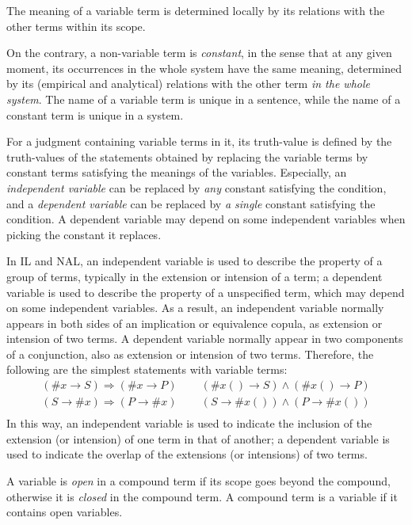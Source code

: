 \begin{defi}
The meaning of a variable term is determined locally by its relations with the other terms within its scope. 
\end{defi}
On the contrary, a non-variable term is \emph{constant}, in the sense that at any given moment, its occurrences in the whole system have the same meaning, determined by its (empirical and analytical) relations with the other term \emph{in the whole system}. The name of a variable term is unique in a sentence, while the name of a constant term is unique in a system.

\begin{defi}
For a judgment containing variable terms in it, its truth-value is defined by the truth-values of the statements obtained by replacing the variable terms by constant terms satisfying the meanings of the variables. Especially, an \emph{independent variable} can be replaced by \emph{any} constant satisfying the condition, and a \emph{dependent variable} can be replaced by \emph{a single} constant satisfying the condition. A dependent variable may depend on some independent variables when picking the constant it replaces.
\end{defi}
In IL and NAL, an independent variable is used to describe the property of a group of terms, typically in the extension or intension of a term; a dependent variable is used to describe the property of a unspecified term, which may depend on some independent variables. As a result, an independent variable normally appears in both sides of an implication or equivalence copula, as extension or intension of two terms. A dependent variable normally appear in two components of a conjunction, also as extension or intension of two terms. Therefore, the following are the simplest statements with variable terms:
\[\begin{array}{rcl}
(\#x \rightarrow S) \Rightarrow (\#x \rightarrow P) \; & \; &
(\#x() \rightarrow S) \wedge (\#x() \rightarrow P) \\
(S \rightarrow \#x) \Rightarrow (P \rightarrow \#x) \; & \; &
(S \rightarrow \#x()) \wedge (P \rightarrow \#x()) \\
\end{array}\]
In this way, an independent variable is used to indicate the inclusion of the extension (or intension) of one term in that of another; a dependent variable is used to indicate the overlap of the extensions (or intensions) of two terms.

\begin{defi}
A variable is \emph{open} in a compound term if its scope goes beyond the compound, otherwise it is \emph{closed} in the compound term. A compound term is a variable if it contains open variables.
\end{defi}

